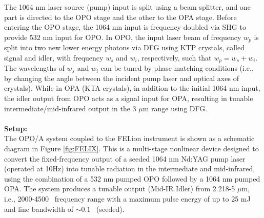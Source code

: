 The 1064 nm laser source (pump) input is split using a beam splitter, and one part is directed to the OPO stage and the other to the OPA stage. Before entering the OPO stage, the 1064 nm input is frequency doubled via SHG to provide 532 nm input for OPO. In OPO, the input laser beam of frequency $w_p$ is split into two new lower energy photons via DFG using KTP crystals, called signal and idler, with frequency $w_s$ and $w_i$, respectively, such that $w_p = w_s + w_i$. The wavelengths of $w_s$ and $w_i$ can be tuned by phase-matching conditions (i.e., by changing the angle between the incident pump laser and optical axes of crystals). While in OPA (KTA crystals), in addition to the initial 1064 nm input, the idler output from OPO acts as a signal input for OPA, resulting in tunable intermediate/mid-infrared output in the 3 $\mu$m range using DFG.\\
\\
\textbf{Setup:}\\
The OPO/A system coupled to the FELion instrument is shown as a schematic diagram in Figure \ref{fig:FELIX}. This is a multi-stage nonlinear device designed to convert the fixed-frequency output of a seeded 1064 nm Nd:YAG pump laser (operated at 10Hz) into tunable radiation in the intermediate and mid-infrared, using the combination of a 532 nm pumped OPO followed by a 1064 nm pumped OPA. The system produces a tunable output (Mid-IR Idler) from 2.218-5 $\mu$m, i.e., 2000-4500 \wn\ frequency range with a maximum pulse energy of up to 25 mJ and line bandwidth of $\sim 0.1$ \wn\ (seeded).

